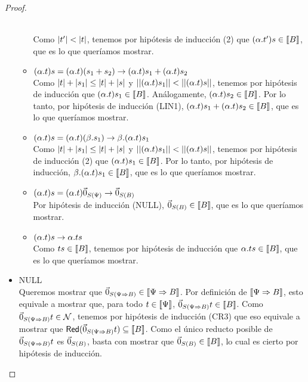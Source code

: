 \begin{proof}
\begin{itemize}
\begin{itemize}
          \\ Como \( |t'| < |t| \), tenemos por hipótesis de inducción (2) que \( (\alpha . t') s \in \llbracket B\rrbracket \), que es lo que queríamos mostrar.
          \item \( (\alpha . t) s = (\alpha . t) (s_1 + s_2) \rightarrow (\alpha . t) s_1 + (\alpha . t) s_2 \)
          \\ Como \( |t| + |s_1| \leq |t| + |s| \) y \( ||(\alpha . t) s_1|| < ||(\alpha . t) s|| \), tenemos por hipótesis de inducción que \( (\alpha . t) s_1 \in \llbracket B\rrbracket \). Análogamente, \( (\alpha . t) s_2 \in \llbracket B\rrbracket \). Por lo tanto, por hipótesis de inducción (LIN1), \( (\alpha . t) s_1 + (\alpha . t) s_2 \in \llbracket B\rrbracket \), que es lo que queríamos mostrar.
          \item \( (\alpha . t) s = (\alpha . t) (\beta . s_1) \rightarrow \beta . (\alpha. t) s_1 \)
          \\ Como \( |t| + |s_1| \leq |t| + |s| \) y \( ||(\alpha . t) s_1|| < ||(\alpha . t) s|| \), tenemos por hipótesis de inducción (2) que \( (\alpha . t) s_1 \in \llbracket B\rrbracket \). Por lo tanto, por hipótesis de inducción, \( \beta . (\alpha . t) s_1 \in \llbracket B\rrbracket \), que es lo que queríamos mostrar.
          \item \( (\alpha . t) s = (\alpha . t) \vec{0}_{S (\Psi)} \rightarrow \vec{0}_{S (B)} \)
          \\ Por hipótesis de inducción (NULL), \( \vec{0}_{S (B)} \in \llbracket B\rrbracket \), que es lo que queríamos mostrar.
          \item \( (\alpha . t) s \rightarrow \alpha . t s \)
          \\ Como \( t s \in \llbracket B\rrbracket \), tenemos por hipótesis de inducción que \( \alpha . t s \in \llbracket B\rrbracket \), que es lo que queríamos mostrar.
        \end{itemize}
      \item NULL
        \\ Queremos mostrar que \( \vec{0}_{S (\Psi \Rightarrow B)} \in \llbracket\Psi \Rightarrow B\rrbracket \). Por definición de \( \llbracket\Psi \Rightarrow B\rrbracket \), esto equivale a mostrar que, para todo \( t \in \llbracket\Psi\rrbracket \), \( \vec{0}_{S (\Psi \Rightarrow B)} t \in \llbracket B\rrbracket \). Como \( \vec{0}_{S (\Psi \Rightarrow B)} t \in \mathcal{N} \), tenemos por hipótesis de inducción (CR3) que eso equivale a mostrar que \( \mathsf{Red} (\vec{0}_{S (\Psi \Rightarrow B)} t) \subseteq \llbracket B\rrbracket \). Como el único reducto posible de \( \vec{0}_{S (\Psi \Rightarrow B)} t \) es \( \vec{0}_{S (B)} \), basta con mostrar que \( \vec{0}_{S (B)} \in \llbracket B\rrbracket \), lo cual es cierto por hipótesis de inducción.
    \end{itemize}

\end{proof}
